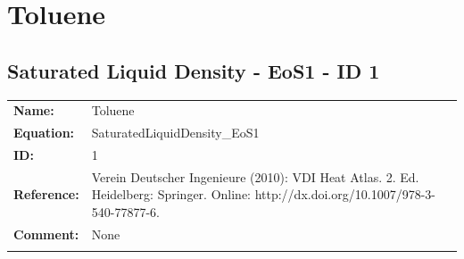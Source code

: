 \section{Toluene}
%
\subsection{Saturated Liquid Density - EoS1 - ID 1}
%
\begin{tabular}[l]{|lp{11.5cm}|}
\hline
\addlinespace

\textbf{Name:} & Toluene \\
\textbf{Equation:} & SaturatedLiquidDensity\_EoS1 \\
\textbf{ID:} & 1 \\
\textbf{Reference:} & Verein Deutscher Ingenieure (2010): VDI Heat Atlas. 2. Ed. Heidelberg: Springer. Online: http://dx.doi.org/10.1007/978-3-540-77877-6. \\
\textbf{Comment:} & None \\

\addlinespace
\hline
\end{tabular}
\newline

